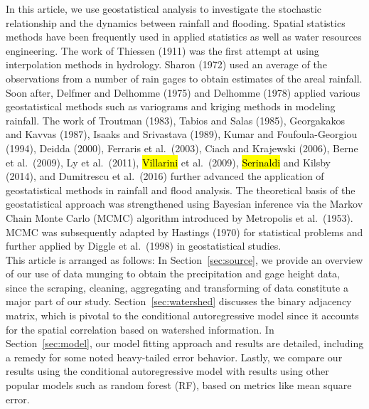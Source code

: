 In this article, we use geostatistical analysis to  investigate the stochastic relationship and  the dynamics between rainfall and flooding.
Spatial statistics methods have been frequently used in applied statistics as well as water resources engineering.
 The work of Thiessen (1911) was the first attempt at using interpolation methods in hydrology.
Sharon (1972) used an average of the observations from a number of rain gages to obtain estimates of the areal rainfall.
 Soon after,  Delfmer and Delhomme (1975) and Delhomme (1978) applied various geostatistical methods such as variograms and kriging methods in modeling rainfall.
 The work of Troutman (1983), Tabios and Salas (1985), Georgakakos and Kavvas (1987), Isaaks and Srivastava (1989), Kumar and Foufoula-Georgiou (1994), Deidda (2000), Ferraris et al.\ (2003), Ciach and Krajewski (2006), Berne et al.\ (2009),  Ly et al.\ (2011), \hl{Villarini} et al.\ (2009), \hl{Serinaldi} and Kilsby (2014), and Dumitrescu et al.\ (2016) further advanced the application of geostatistical methods in rainfall and flood analysis.
  The theoretical basis of the geostatistical approach was strengthened using Bayesian inference via the Markov Chain Monte Carlo (MCMC) algorithm introduced by Metropolis et al.\ (1953).
  MCMC was subsequently adapted by Hastings (1970) for statistical problems and further applied by Diggle et al.\ (1998) in geostatistical studies.\\

This article is arranged as follows: In Section~\ref{sec:source}, we provide an overview of our use of data munging to obtain the precipitation and gage height data, since the scraping, cleaning, aggregating and transforming of data constitute a major part of our study.
 Section~\ref{sec:watershed} discusses the binary adjacency matrix, which is pivotal to the conditional autoregressive model since it accounts for the spatial correlation based on watershed information.
In Section~\ref{sec:model}, our model fitting approach and results are detailed, including a remedy for some noted heavy-tailed error behavior.
Lastly, we compare our results using the conditional autoregressive model with results using other popular models such as random forest (RF), based on metrics like mean square error.